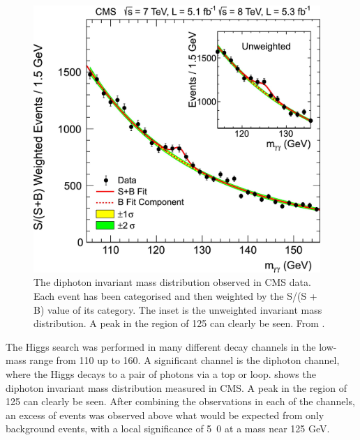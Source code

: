 \begin{figure}[htbp]
  \centering
  \includegraphics[width=0.97\textwidth]{higgs}
  \caption{The diphoton invariant mass distribution observed in CMS data.  Each event has been
categorised and then weighted by the S/(S + B) value of its category. The inset
is the unweighted invariant mass distribution. A peak in the region of \unit{125}{\GeV} can
clearly be seen. From \cite{chatrchyan2012observation}. }
  \label{fig:hgg}
\end{figure}

The Higgs search was performed in many different decay channels in the
low-mass range from 110 up to \unit{160}{\GeV}. A significant channel is the
diphoton channel, where the Higgs decays to a pair of photons via a top or \PW loop.
 shows the diphoton invariant mass distribution measured in CMS.
A peak in the region of \unit{125}{\GeV} can clearly be seen. 
After combining the observations in each of the channels, an excess of events
was observed above what would be expected from only background events, with a
local signiﬁcance of \unit{5.0}{\sigma} at a mass near 125 GeV.

